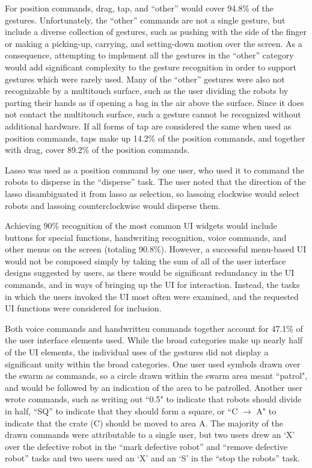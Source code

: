 For position commands, drag, tap, and ``other'' would cover 94.8\% of the gestures. 
Unfortunately, the ``other'' commands are not a single gesture, but include a diverse collection of gestures, such as pushing with the side of the finger or making a picking-up, carrying, and setting-down motion over the screen.
As a consequence, attempting to implement all the gestures in the ``other'' category would add significant complexity to the gesture recognition in order to support gestures which were rarely used. 
Many of the ``other'' gestures were also not recognizable by a multitouch surface, such as the user dividing the robots by parting their hands as if opening a bag in the air above the surface. 
Since it does not contact the multitouch surface, such a gesture cannot be recognized without additional hardware. 
If all forms of tap are considered the same when used as position commands, taps make up 14.2\% of the position commands, and together with drag, cover 89.2\% of the position commands. 

Lasso was used as a position command by one user, who used it to command the robots to disperse in the ``disperse'' task. 
The user noted that the direction of the lasso disambiguated it from lasso as selection, so lassoing clockwise would select robots and lassoing counterclockwise would disperse them. 

Achieving 90\% recognition of the most common UI widgets would include buttons for special functions, handwriting recognition, voice commands, and other menus on the screen (totaling 90.8\%). 
However, a successful menu-based UI would not be composed simply by taking the sum of all of the user interface designs suggested by users, as there would be significant redundancy in the UI commands, and in ways of bringing up the UI for interaction. 
Instead, the tasks in which the users invoked the UI most often were examined, and the requested UI functions were considered for inclusion.

Both voice commands and handwritten commands together account for 47.1\% of the user interface elements used.
While the broad categories make up nearly half of the UI elements, the individual uses of the gestures did not display a significant unity within the broad categories.
One user used symbols drawn over the swarm as commands, so a circle drawn within the swarm area meant ``patrol", and would be followed by an indication of the area to be patrolled. 
Another user wrote commands, such as writing out ``0.5" to indicate that robots should divide in half, ``SQ'' to indicate that they should form a square, or ``C $\rightarrow$ A" to indicate that the crate (C) should be moved to area A. 
The majority of the drawn commands were attributable to a single user, but two users drew an `X' over the defective robot in the ``mark defective robot'' and ``remove defective robot'' tasks and two users used an `X' and an `S' in the ``stop the robots'' task.

